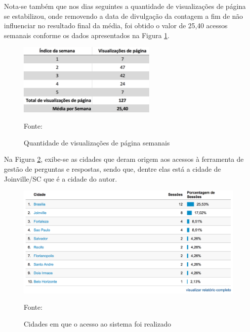 \FloatBarrier 	%
				
Nota-se também que nos dias seguintes a quantidade de visualizações de página
se estabilizou, onde removendo a data de divulgação da contagem a fim de não
influenciar no resultado final da média, foi obtido o valor de 25,40 acessos
semanais conforme os dados apresentados na Figura \ref{fig:googleAnalyticsMediaVisualizacoes}.

\begin{figure}[h!tb]
	\caption{Quantidade de visualizações de página semanais}
	\label{fig:googleAnalyticsMediaVisualizacoes}

	\centering
	\includegraphics[width=0.6\textwidth]{images/resultados/google-analytics-media-visualizacoes.png}

	\centering
	\footnotesize Fonte: \fonteOAutor
\end{figure}

\FloatBarrier 	%

Na Figura \ref{fig:googleAnalyticsCidade}, exibe-se as cidades que deram
origem aos acessos à ferramenta de gestão de perguntas e respostas, sendo
que, dentre elas está a cidade de Joinville/SC que é a cidade do autor.

\begin{figure}[h!tb]
	\caption{Cidades em que o acesso ao sistema foi realizado}
	\label{fig:googleAnalyticsCidade}

	\centering
	\includegraphics[width=\textwidth]{images/resultados/google-analytics-cidade.png}

	\centering
	\footnotesize Fonte: \fonteOAutor
\end{figure}

